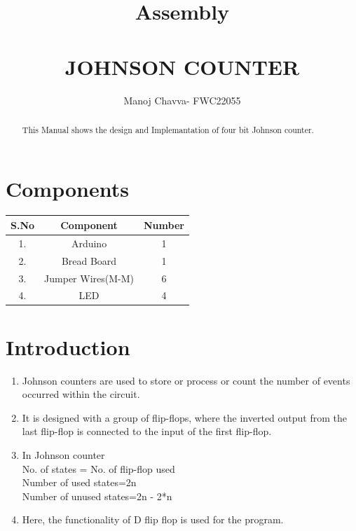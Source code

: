 \documentclass[journal,12pt,twocolumn]{IEEEtran}
\title{Assembly  \\ \textbf{\\JOHNSON COUNTER}}
\author{Manoj Chavva- FWC22055}
\begin{document}
\maketitle

\tableofcontents
\vspace{0.5cm}
\begin{abstract}
  This Manual shows the design and Implemantation of four bit Johnson counter.
\end{abstract}   


 
     \section{Components}  
       

\begin{tabular}{|c|c|c|}
    \hline 
      \textbf{S.No} & \textbf{Component} & \textbf{Number}\\
      \hline
	1. & Arduino & 1 \\
	2. & Bread Board & 1 \\
	3. & Jumper Wires(M-M) & 6 \\
	4. & LED & 4 \\
	
      \hline
      
   \end{tabular}
   

     \vspace{0.35cm}




\section{Introduction}
\begin{enumerate}
  \item Johnson counters are used to store or process or count the number of events occurred within the circuit.
  \item It is designed with a group of flip-flops, where the inverted output from the last flip-flop is connected to the input of the first flip-flop.
  \item In Johnson counter
  \\No. of states = No. of flip-flop used  
\\Number of used states=2n  
\\Number of unused states=2n - 2*n  
\item Here, the functionality of D flip flop is used for the program. 
\end{enumerate}
\end{document}
